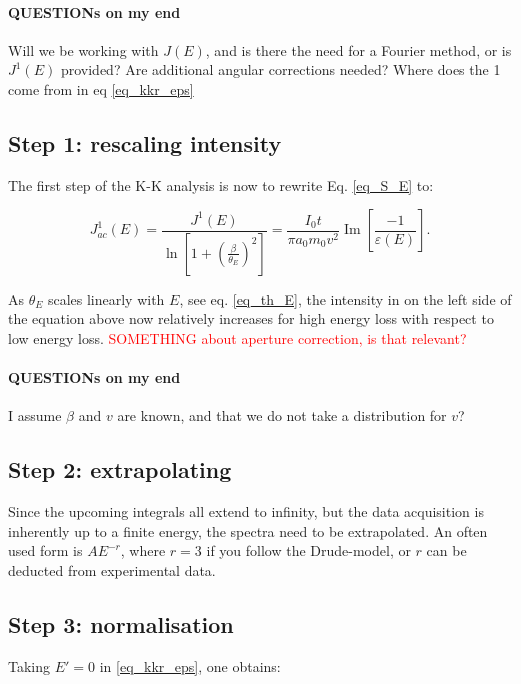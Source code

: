 \documentclass{article}
\begin{document}
\paragraph{QUESTIONs on my end} Will we be working with $J(E)$, and is there the need for a Fourier method, or is $J^1(E)$ provided? Are additional angular corrections needed? Where does the 1 come from in eq \eqref{eq_kkr_eps}

\subsection{Step 1: rescaling intensity}
The first step of the K-K analysis is now to rewrite Eq. \eqref{eq_S_E} to:

\begin{equation}\label{eq_J_ac}
    J^1_{ac}(E) = \frac{J^1(E)}{\ln \left[1+\left(\frac{\beta}{\theta_{E}}\right)^{2}\right]} =\frac{I_{0} t}{\pi a_{0} m_{0} v^{2}}  \operatorname{Im}\left[\frac{-1}{\varepsilon(E)}\right] .
\end{equation}


As $\theta_E$ scales linearly with $E$, see eq. \eqref{eq_th_E}, the intensity in on the left side of the equation above now relatively increases for high energy loss with respect to low energy loss. \textcolor{red}{SOMETHING about aperture correction, is that relevant? }


\paragraph{QUESTIONs on my end} I assume $\beta$ and $v$ are known, and that we do not take a distribution for $v$? 


\subsection{Step 2: extrapolating}
Since the upcoming integrals all extend to infinity, but the data acquisition is inherently up to a finite energy, the spectra need to be extrapolated. An often used form is $AE^{-r}$, where $r=3$ if you follow the Drude-model, or $r$ can be deducted from experimental data.



\subsection{Step 3: normalisation}

Taking $E' = 0$ in \eqref{eq_kkr_eps}, one obtains:
\end{document}
